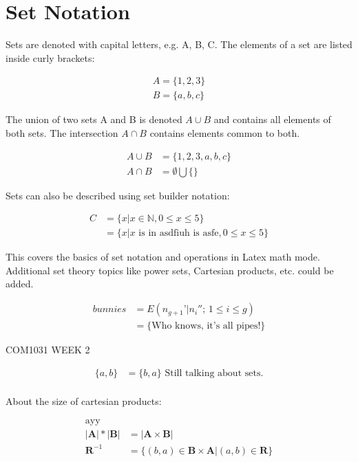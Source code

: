 \documentclass{article}
\begin{document}
\section{Set Notation}

Sets are denoted with capital letters, e.g. A, B, C. The elements of a set are listed inside curly brackets:

\begin{align}
A = \{1, 2, 3\} \\
B = \{a, b, c\}
\end{align}

The union of two sets A and B is denoted $A \cup B$ and contains all elements of both sets. The intersection $A \cap B$ contains elements common to both.

\begin{align}
A \cup B & = \{1, 2, 3, a, b, c\} \\
A \cap B & = \emptyset \bigcup \{\}
\end{align}

Sets can also be described using set builder notation:

\begin{align}
C & = \{x | x \in \mathbb{N}, 0 \leq x \leq 5\} \\
& = \{x |\textrm{$x$ is in asdfiuh is asfe}, 0 \leq x \leq 5\}
\end{align}

This covers the basics of set notation and operations in Latex math mode. Additional set theory topics like power sets, Cartesian products, etc. could be added.

\begin{align}
bunnies & = E(n_{g+1}’|n_i'';\,1\le i\le g) \\
& = \{\textrm{Who knows, it's all pipes!}\}
\end{align}

COM1031 WEEK 2

\begin{align}
\{a, b\} & = \{b, a\} \textrm{   Still talking about sets.} \\
\end{align}

About the size of cartesian products:

\begin{align}
\textrm{ayy} \\
|\mathbf{A}| * |\mathbf{B}| &= |\mathbf{A} \times \mathbf{B}| \\
\mathbf{R}^{-1} & = \{(b, a) \in \mathbf{B} \times \mathbf{A} \vert (a, b) \in \mathbf{R}\}
\end{align}
\end{document}
